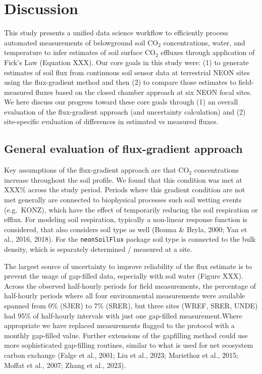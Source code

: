 \documentclass[
  letterpaper,
  DIV=11,
  numbers=noendperiod]{scrartcl}
\begin{document}
\section{Discussion}\label{discussion}

This study presents a unified data science workflow to efficiently
process automated measurements of belowground soil CO\(_{2}\)
concentrations, water, and temperature to infer estimates of soil
surface CO\(_{2}\) effluxes through application of Fick's Law (Equation
XXX). Our core goals in this study were: (1) to generate estimates of
soil flux from continuous soil sensor data at terrestrial NEON sites
using the flux-gradient method and then (2) to compare those estimates
to field-measured fluxes based on the closed chamber approach at six
NEON focal sites. We here discuss our progress toward these core goals
through (1) an overall evaluation of the flux-gradient approach (and
uncertainty calculation) and (2) site-specific evaluation of differences
in estimated vs measured fluxes.

\subsection{General evaluation of flux-gradient
approach}\label{general-evaluation-of-flux-gradient-approach}

Key assumptions of the flux-gradient approach are that CO\(_{2}\)
concentrations increase throughout the soil profile. We found that this
condition was met at XXX\% across the study period. Periods where this
gradient condition are not met generally are connected to biophysical
processes such soil wetting events (e.g.~KONZ), which have the effect of
temporarily reducing the soil respiration or efflux. For modeling soil
respiration, typically a non-linear response function is considered,
that also considers soil type as well (Bouma \& Bryla, 2000; Yan et al.,
2016, 2018). For the \texttt{neonSoilFlux} package soil type is
connected to the bulk density, which is separately determined / measured
at a site.

The largest source of uncertainty to improve reliability of the flux
estimate is to prevent the usage of gap-filled data, especially with
soil water (Figure XXX). Across the observed half-hourly periods for
field measurements, the percentage of half-hourly periods where all four
environmental measurements were available spanned from 0\% (SJER) to 7\%
(SRER), but three sites (WREF, SRER, UNDE) had 95\% of half-hourly
intervals with just one gap-filled measurement.Where appropriate we have
replaced measurements flagged to the protocol with a monthly gap-filled
value. Further extensions of the gapfilling method could use more
sophisticated gap-filling routines, similar to what is used for net
ecosystem carbon exchange (Falge et al., 2001; Liu et al., 2023;
Mariethoz et al., 2015; Moffat et al., 2007; Zhang et al., 2023).
\end{document}

